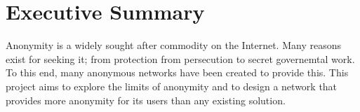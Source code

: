 \documentclass[ %
                    author={Luke Murray},
                supervisor={Dr. Simon Hollis},
                     title={Shadow Peer-to-Peer Networks},
                  subtitle={},
                    degree={MEng},
                      year={2013} ]{thesis}
\begin{document}
\chapter*{Executive Summary}

Anonymity is a widely sought after commodity on the Internet. Many reasons exist for seeking it; from protection from persecution to secret governemtal work. To this end, many anonymous networks have been created to provide this. This project aims to explore the limits of anonymity and to design a network that provides more anonymity for its users than any existing solution.
\end{document}
